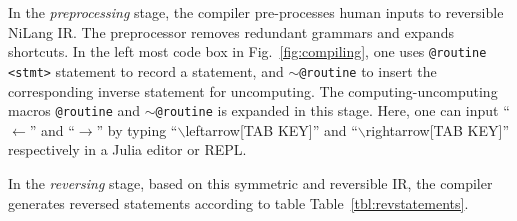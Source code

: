 \documentclass{article}
\newcommand{\<}{\langle}
\renewcommand{\>}{\rangle}
\newcommand{\Fig}[1]{Fig.~\ref{#1}}
\newcommand{\Tbl}[1]{Table~\ref{#1}}
\theoremstyle{definition}\newtheorem{definition}{\textit{Definition}}
\begin{document}
In the \textit{preprocessing} stage, the compiler pre-processes human inputs to reversible NiLang IR.
The preprocessor removes redundant grammars and expands shortcuts. In the left most code box in \Fig{fig:compiling}, one uses \texttt{@routine <stmt>} statement to record a statement, and \texttt{$\sim$@routine} to insert the corresponding inverse statement for uncomputing.
The computing-uncomputing macros \texttt{@routine} and \texttt{$\sim$@routine} is expanded in this stage.
Here, one can input ``$\leftarrow$'' and ``$\rightarrow$'' by typing ``$\backslash$leftarrow[TAB KEY]'' and ``$\backslash$rightarrow[TAB KEY]'' respectively in a Julia editor or REPL.

In the \textit{reversing} stage, based on this symmetric and reversible IR, the compiler generates reversed statements according to table \Tbl{tbl:revstatements}.
\end{document}
